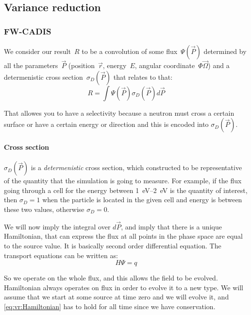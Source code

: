 \subsection{Variance reduction}

\subsubsection{FW-CADIS}
We consider our result~$R$ to be a convolution of some
flux~$\Psi(\vec{P})$ determined by all the parameters~$\vec{P}$
(position~$\vec{r}$, energy~$E$, angular
coordinate~$\Phi\vec{\Omega}$) and a determenistic cross
section~$\sigma_D(\vec{P})$ that relates to that:
\begin{equation}
  \label{eq:vr:result}
  R = \int \Psi(\vec{P}) \sigma_D(\vec{P}) d\vec{P}
\end{equation}

That allowes you to have a selectivity because a neutron must cross a
certain surface or have a certain energy or direction and this is encoded into $\sigma_D(\vec{P})$.

\paragraph{Cross section}
$\sigma_D(\vec{P})$ is a {\em determenistic} cross section, which constructed to be representative of the quantity
that the simulation is going to measure. For example, if the flux going through a cell for the energy between
\SIrange[range-phrase=\ and\ ]{1}{2}{\electronvolt} is the quantity of interest, then
$\sigma_D=1$ when the particle is located in the given cell and energy is between these two values,
otherwise $\sigma_D=0$.

\bigskip

We will now imply the integral over $d\vec{P}$, and imply that there is a unique Hamiltonian,
that can express the flux at all points in the phase space are equal to the source value. It is basically
second order differential equation. The transport equations can be written as:
\begin{equation}
  \label{eq:vr:Hamiltonian}
  H \Psi = q
\end{equation}


So we operate on the whole flux, and this allows the field to be evolved.
Hamiltonian always operates on flux in order to evolve it to a new type.
We will assume that we start at some source at time zero and we will evolve it, and \eqref{eq:vr:Hamiltonian} has to
hold for all time since we have conservation.

